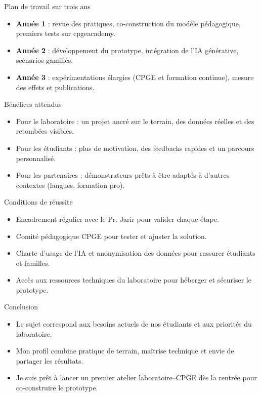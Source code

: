 \documentclass[aspectratio=169]{beamer}
\begin{document}
\begin{frame}{Plan de travail sur trois ans}
  \begin{itemize}
    \item \textbf{Année 1} : revue des pratiques, co-construction du modèle pédagogique, premiers tests sur cpgeacademy.
    \item \textbf{Année 2} : développement du prototype, intégration de l'IA générative, scénarios gamifiés.
    \item \textbf{Année 3} : expérimentations élargies (CPGE et formation continue), mesure des effets et publications.
  \end{itemize}
\end{frame}

\begin{frame}{Bénéfices attendus}
  \begin{itemize}
    \item Pour le laboratoire : un projet ancré sur le terrain, des données réelles et des retombées visibles.
    \item Pour les étudiants : plus de motivation, des feedbacks rapides et un parcours personnalisé.
    \item Pour les partenaires : démonstrateurs prêts à être adaptés à d'autres contextes (langues, formation pro).
  \end{itemize}
\end{frame}

\begin{frame}{Conditions de réussite}
  \begin{itemize}
    \item Encadrement régulier avec le Pr. Jarir pour valider chaque étape.
    \item Comité pédagogique CPGE pour tester et ajuster la solution.
    \item Charte d'usage de l'IA et anonymisation des données pour rassurer étudiants et familles.
    \item Accès aux ressources techniques du laboratoire pour héberger et sécuriser le prototype.
  \end{itemize}
\end{frame}

\begin{frame}{Conclusion}
  \begin{itemize}
    \item Le sujet correspond aux besoins actuels de nos étudiants et aux priorités du laboratoire.
    \item Mon profil combine pratique de terrain, maîtrise technique et envie de partager les résultats.
    \item Je suis prêt à lancer un premier atelier laboratoire--CPGE dès la rentrée pour co-construire le prototype.
  \end{itemize}
\end{frame}
\end{document}
